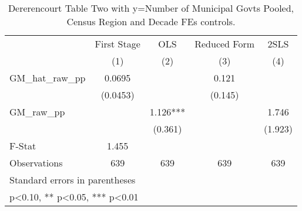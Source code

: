 \begin{table}[htbp]\centering
\def\sym#1{\ifmmode^{#1}\else\(^{#1}\)\fi}
\caption{Dererencourt Table Two with y=Number of Municipal Govts  Pooled, Census Region and Decade FEs controls.}
\begin{tabular}{l*{4}{c}}
\toprule
                    & First Stage   &         OLS   &Reduced Form   &        2SLS   \\
                    &\multicolumn{1}{c}{(1)}   &\multicolumn{1}{c}{(2)}   &\multicolumn{1}{c}{(3)}   &\multicolumn{1}{c}{(4)}   \\
\midrule
GM\_hat\_raw\_pp       &      0.0695   &               &       0.121   &               \\
                    &    (0.0453)   &               &     (0.145)   &               \\
\addlinespace
GM\_raw\_pp           &               &       1.126***&               &       1.746   \\
                    &               &     (0.361)   &               &     (1.923)   \\
\midrule
F-Stat              &       1.455   &               &               &               \\
Observations        &         639   &         639   &         639   &         639   \\
\bottomrule
\multicolumn{5}{l}{\footnotesize Standard errors in parentheses}\\
\multicolumn{5}{l}{\footnotesize * p<0.10, ** p<0.05, *** p<0.01}\\
\end{tabular}
\end{table}
